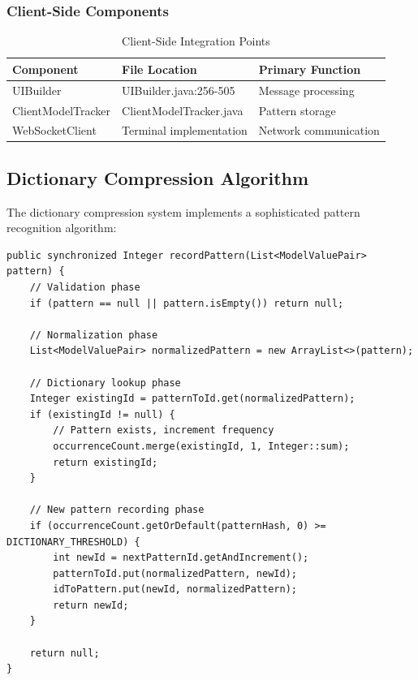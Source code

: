 \documentclass[12pt,a4paper]{article}
\begin{document}
\subsubsection{Client-Side Components}

\begin{table}[H]
\centering
\begin{tabular}{|l|l|l|}
\hline
\textbf{Component} & \textbf{File Location} & \textbf{Primary Function} \\
\hline
UIBuilder & UIBuilder.java:256-505 & Message processing \\
ClientModelTracker & ClientModelTracker.java & Pattern storage \\
WebSocketClient & Terminal implementation & Network communication \\
\hline
\end{tabular}
\caption{Client-Side Integration Points}
\label{tab:client-components}
\end{table}

\subsection{Dictionary Compression Algorithm}

The dictionary compression system implements a sophisticated pattern recognition algorithm:

\begin{lstlisting}[caption=Dictionary Pattern Recording Algorithm]
public synchronized Integer recordPattern(List<ModelValuePair> pattern) {
    // Validation phase
    if (pattern == null || pattern.isEmpty()) return null;
    
    // Normalization phase
    List<ModelValuePair> normalizedPattern = new ArrayList<>(pattern);
    
    // Dictionary lookup phase
    Integer existingId = patternToId.get(normalizedPattern);
    if (existingId != null) {
        // Pattern exists, increment frequency
        occurrenceCount.merge(existingId, 1, Integer::sum);
        return existingId;
    }
    
    // New pattern recording phase
    if (occurrenceCount.getOrDefault(patternHash, 0) >= DICTIONARY_THRESHOLD) {
        int newId = nextPatternId.getAndIncrement();
        patternToId.put(normalizedPattern, newId);
        idToPattern.put(newId, normalizedPattern);
        return newId;
    }
    
    return null;
}
\end{lstlisting}
\end{document}
